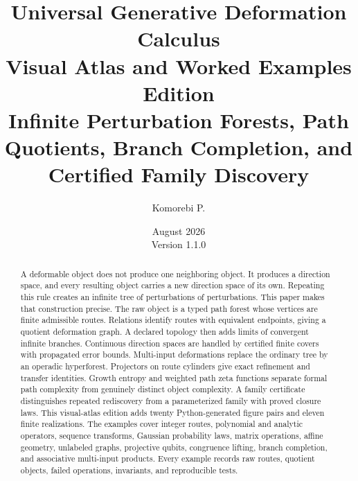 \documentclass[11pt,openany]{report}
\title{\textbf{Universal Generative Deformation Calculus}\\[0.42em]
\large Visual Atlas and Worked Examples Edition\\[0.30em]
\normalsize Infinite Perturbation Forests, Path Quotients, Branch Completion, and Certified Family Discovery}
\author{Komorebi P.}
\date{August 2026\\Version 1.1.0}
\theoremstyle{definition}
\theoremstyle{remark}
\begin{document}
\maketitle

\begin{abstract}
A deformable object does not produce one neighboring object. It produces a direction space, and every resulting object carries a new direction space of its own. Repeating this rule creates an infinite tree of perturbations of perturbations. This paper makes that construction precise. The raw object is a typed path forest whose vertices are finite admissible routes. Relations identify routes with equivalent endpoints, giving a quotient deformation graph. A declared topology then adds limits of convergent infinite branches. Continuous direction spaces are handled by certified finite covers with propagated error bounds. Multi-input deformations replace the ordinary tree by an operadic hyperforest. Projectors on route cylinders give exact refinement and transfer identities. Growth entropy and weighted path zeta functions separate formal path complexity from genuinely distinct object complexity. A family certificate distinguishes repeated rediscovery from a parameterized family with proved closure laws. This visual-atlas edition adds twenty Python-generated figure pairs and eleven finite realizations. The examples cover integer routes, polynomial and analytic operators, sequence transforms, Gaussian probability laws, matrix operations, affine geometry, unlabeled graphs, projective qubits, congruence lifting, branch completion, and associative multi-input products. Every example records raw routes, quotient objects, failed operations, invariants, and reproducible tests.
\end{abstract}

\begin{center}
\end{center}
\end{document}

